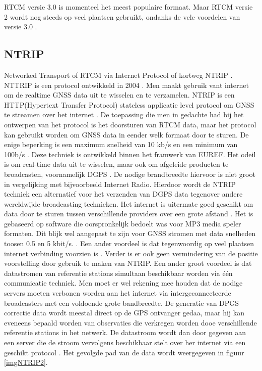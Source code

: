 RTCM versie 3.0 is momenteel het meest populaire formaat. Maar RTCM versie 2 wordt nog steeds op veel plaatsen gebruikt, ondanks de vele voordelen van versie 3.0 \cite{LBibRTCM}.

\subsection{NTRIP}
\label{LNTR}
Networked Transport of RTCM via Internet Protocol of kortweg NTRIP \cite{LBibNTRIP,LBibNTRIP3}. NTTRIP is een protocol ontwikkeld in 2004 \cite{LBibNTRIP3}. Men maakt gebruik vant internet om de realtime GNSS data uit te wisselen en te verzamelen. NTRIP is een HTTP(Hypertext Transfer Protocol) stateless applicatie level protocol om GNSS te streamen over het internet \cite{LBibNTRIP}. De toepassing die men in gedachte had bij het ontwerpen van het protocol is het doorsturen van RTCM data, maar het protocol kan gebruikt worden om GNSS data in eender welk formaat door te sturen. De enige beperking is een maximum snelheid van 10 kb/s en een minimum van 100b/s \cite{LBibNTRIP3}. Deze techniek is ontwikkeld binnen het framwerk van EUREF. Het odeil is om real-time data uit te wisselen, maar ook om afgeleide producten te broadcasten, voornamelijk DGPS \cite{LBibNTRIP2}. De nodige brandbreedte hiervoor is niet groot in vergelijking met bijvoorbeeld Internet Radio\cite{LBibNTRIP}. Hierdoor wordt de NTRIP techniek een alternatief voor het verzenden van DGPS data tegenover andere  wereldwijde broadcasting technieken. Het internet is uitermate goed geschikt om data door te sturen tussen verschillende providers over een grote afstand \cite{LBibNTRIP2}. Het is gebaseerd op software die oorspronkelijk bedoelt was voor MP3 media speler formaten. Dit blijk wel aangepast te zijn voor GNSS stromen met data snelheden toosen 0.5 en 5 kbit/s. \cite{LBibGPS}. Een ander voordeel is dat tegenwoordig op veel plaatsen internet verbinding voorzien is \cite{LBibNTRIP}. Verder is er ook geen vermindering van de positie voorstelling door gebruik te maken van NTRIP. Een ander groot voordeel is dat datastromen van referentie stations simultaan beschikbaar worden via \'e\'en communicatie techniek. Men moet er wel rekening mee houden dat de nodige servers moeten verbonen worden aan het internet via intergeconnecteerde broadcasters met een voldoende grote bandbreedte.  De generatie van DPGS correctie data wordt meestal direct op de GPS ontvanger gedaa, maar hij kan eveneens bepaald worden van observaties die verkregen worden dooe verschillende referentie stations in het netwerk. De datastroom wordt dan door gegeven aan een server die de stroom vervolgens beschikbaar stelt over her internet via een geschikt protocol \cite{LBibNTRIP2}. Het gevolgde pad van de data wordt weergegeven in figuur \ref{imgNTRIP2}.
